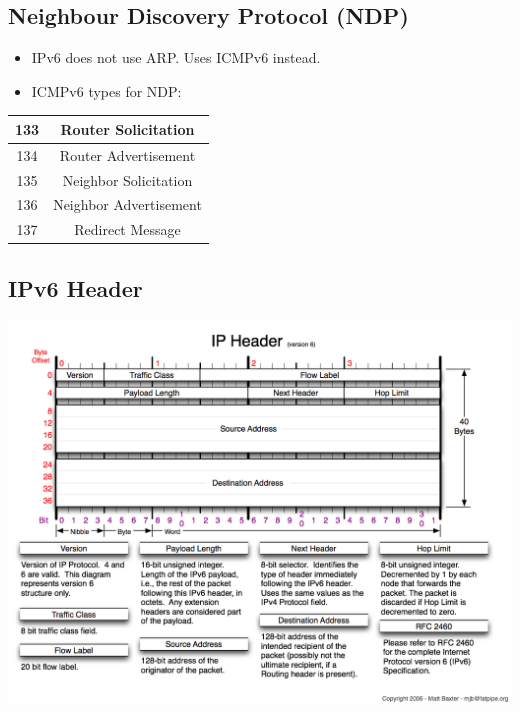 \documentclass{article}
\begin{document}
	
\subsection{Neighbour Discovery Protocol (NDP)}
	
\begin{itemize}
	\item IPv6 does not use ARP. Uses ICMPv6 instead.
	\item ICMPv6 types for NDP:
\end{itemize}	

\begin{center}
  	\begin{tabular}{ | c | c | }
    	\hline
		133 & Router Solicitation \\ \hline
		134 & Router Advertisement \\ \hline
		135 & Neighbor Solicitation \\ \hline
		136 & Neighbor Advertisement \\ \hline
		137 & Redirect Message \\
		\hline
	\end{tabular}
\end{center}


\subsection{IPv6 Header}

\centerline{\includegraphics[scale=0.45]{images/IPv6-Header.png}\\[1cm]}





	
	
	
	
\newpage


\printbibliography
\end{document}
